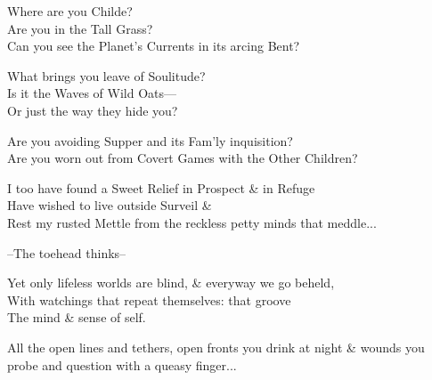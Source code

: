 

\secdiv

Where are you Childe? \\
Are you in the Tall Grass? \\
Can you see the Planet's Currents in its arcing Bent? 

What brings you leave of Soulitude? \\
Is it the Waves of Wild Oats— \\
Or just the way they hide you? 

Are you avoiding Supper and its Fam'ly inquisition? \\
Are you worn out from Covert Games with the Other Children?

I too have found a Sweet Relief in Prospect \& in Refuge \\
Have wished to live outside Surveil \& \\
Rest my rusted Mettle from the reckless petty minds that meddle...

\secdiv

--The toehead thinks--

Yet only lifeless worlds are blind, \& everyway we go beheld, \\
With watchings that repeat themselves: that groove \\
The mind \& sense of self. 


All the open lines and tethers,  open fronts you drink at night \& wounds you probe and question with a queasy finger...